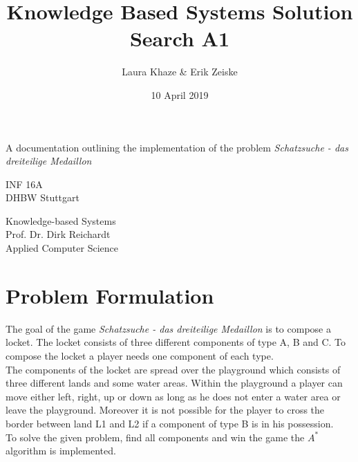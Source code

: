 \documentclass{article}
\title{Knowledge Based Systems Solution Search A1}
\author{Laura Khaze \& Erik Zeiske}
\date{10 April 2019}
\newcommand{\problem}{Schatzsuche - das dreiteilige Medaillon}
\begin{document}
\begin{titlepage}
    \begin{center}
        \vspace*{1cm}
 
        \Huge
        \textbf{\@title}
 
        \vspace{0.5cm}
        \LARGE
        A documentation outlining the implementation of the problem \textit{\problem}
 
        \vspace{1.5cm}
 
        \textbf{\@author}
 
        \vfill
        INF 16A\\
        DHBW Stuttgart\\
        \@date
       
        \vspace{1.8cm}
 
        Knowledge-based Systems \\
        Prof. Dr. Dirk Reichardt \\
        Applied Computer Science
 
 
    \end{center}
\end{titlepage}
\section{Problem Formulation} \label{problem_formulation}
The goal of the game \textit{\problem} is to compose a locket. The locket consists of three different components of type A, B and C. To compose the locket a player needs one component of each type. \\
The components of the locket are spread over the playground which consists of three different lands and some water areas. Within the playground a player can move either left, right, up or down as long as he does not enter a water area or leave the playground. Moreover it is not possible for the player to cross the border between land L1 and L2 if a component of type B is in his possession. \\
To solve the given problem, find all components and win the game the $A^*$ algorithm is implemented. \\
\end{document}
